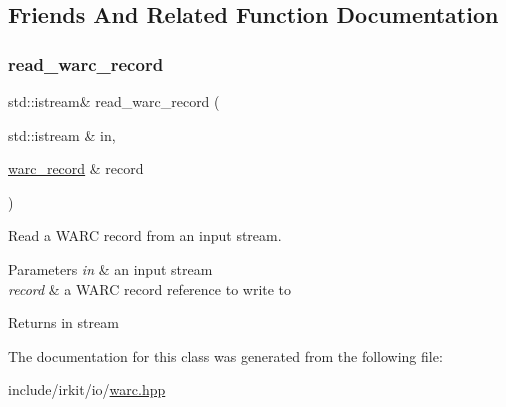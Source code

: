 \subsection{Friends And Related Function Documentation}
\mbox{\label{classirkit_1_1io_1_1warc__record_a3ffe8b4b7fc8c809d6ce483d2272f7a3}} 
\subsubsection{\texorpdfstring{read\+\_\+warc\+\_\+record}{read\_warc\_record}}
{\footnotesize\ttfamily std\+::istream\& read\+\_\+warc\+\_\+record (\begin{DoxyParamCaption}\item[{std\+::istream \&}]{in,  }\item[{\mbox{\hyperlink{classirkit_1_1io_1_1warc__record}{warc\+\_\+record}} \&}]{record }\end{DoxyParamCaption})\hspace{0.3cm}{\ttfamily [friend]}}



Read a W\+A\+RC record from an input stream. 


\begin{DoxyParams}{Parameters}
{\em in} & an input stream \\
\hline
{\em record} & a W\+A\+RC record reference to write to \\
\hline
\end{DoxyParams}
\begin{DoxyReturn}{Returns}
{\ttfamily in} stream 
\end{DoxyReturn}


The documentation for this class was generated from the following file\+:\begin{DoxyCompactItemize}
\item 
include/irkit/io/\mbox{\hyperlink{warc_8hpp}{warc.\+hpp}}\end{DoxyCompactItemize}
